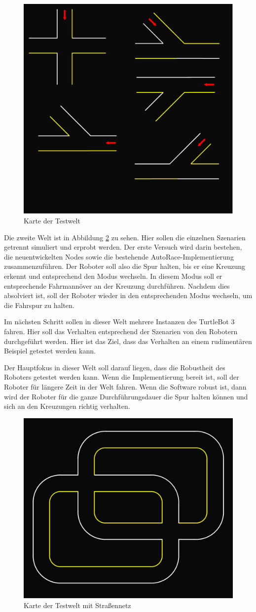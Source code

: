 \begin{figure}[h!]
  \centering
  \includegraphics[height=0.5\textwidth]{images/road_test_map.png}
  \caption{Karte der Testwelt}
  \label{fig:Testworld_Map}
\end{figure}

Die zweite Welt ist in Abbildung \ref{fig:Testworld_Autorace_Map} zu sehen. Hier sollen die einzelnen Szenarien getrennt simuliert und erprobt werden. Der erste Versuch wird darin bestehen,
die neuentwickelten Nodes sowie die bestehende AutoRace-Implementierung zusammenzuführen. Der Roboter soll also die Spur halten, bis er eine Kreuzung erkennt und entsprechend den Modus
wechseln. In diesem Modus soll er entsprechende Fahrmannöver an der Kreuzung durchführen. Nachdem dies absolviert ist, soll der Roboter wieder in den entsprechenden Modus wechseln,
um die Fahrspur zu halten.

Im nächsten Schritt sollen in dieser Welt mehrere Instanzen des TurtleBot 3 fahren. Hier soll das Verhalten entsprechend der Szenarien von den Robotern durchgeführt werden. Hier ist das Ziel,
dass das Verhalten an einem rudimentären Beispiel getestet werden kann.

Der Hauptfokus in dieser Welt soll darauf liegen, dass die Robustheit des Roboters getestet werden kann. Wenn die Implementierung bereit ist, soll der Roboter für längere Zeit in der
Welt fahren. Wenn die Software robust ist, dann wird der Roboter für die ganze Durchführungsdauer die Spur halten können und sich an den Kreuzungen richtig verhalten.

\begin{figure}[h!]
    \centering
    \includegraphics[height=0.5\textwidth]{images/road_autorace_map.png}
    \caption{Karte der Testwelt mit Straßennetz}
    \label{fig:Testworld_Autorace_Map}
  \end{figure}

